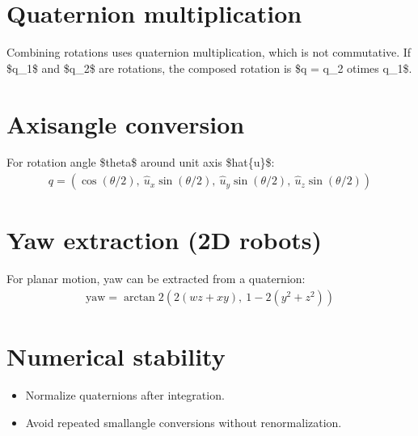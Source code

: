 \documentclass[letterpaper,10pt,english]{sphinxmanual}
\begin{document}
\section{Quaternion multiplication}
\label{\detokenize{appendix_i_quaternions:quaternion-multiplication}}
\sphinxAtStartPar
Combining rotations uses quaternion multiplication, which is not commutative.
If \$q\_1\$ and \$q\_2\$ are rotations, the composed rotation is \$q = q\_2 otimes q\_1\$.


\section{Axis\sphinxhyphen{}angle conversion}
\label{\detokenize{appendix_i_quaternions:axis-angle-conversion}}
\sphinxAtStartPar
For rotation angle \$theta\$ around unit axis \$hat\{u\}\$:
\begin{equation*}
\begin{split}q = \left(\cos(\theta/2),\ \hat{u}_x\sin(\theta/2),\ \hat{u}_y\sin(\theta/2),\ \hat{u}_z\sin(\theta/2)\right)\end{split}
\end{equation*}

\section{Yaw extraction (2D robots)}
\label{\detokenize{appendix_i_quaternions:yaw-extraction-2d-robots}}
\sphinxAtStartPar
For planar motion, yaw can be extracted from a quaternion:
\begin{equation*}
\begin{split}\text{yaw} = \arctan2(2(wz + xy),\ 1 - 2(y^2 + z^2))\end{split}
\end{equation*}

\section{Numerical stability}
\label{\detokenize{appendix_i_quaternions:numerical-stability}}\begin{itemize}
\item {} 
\sphinxAtStartPar
Normalize quaternions after integration.

\item {} 
\sphinxAtStartPar
Avoid repeated small\sphinxhyphen{}angle conversions without renormalization.

\end{itemize}
\end{document}
